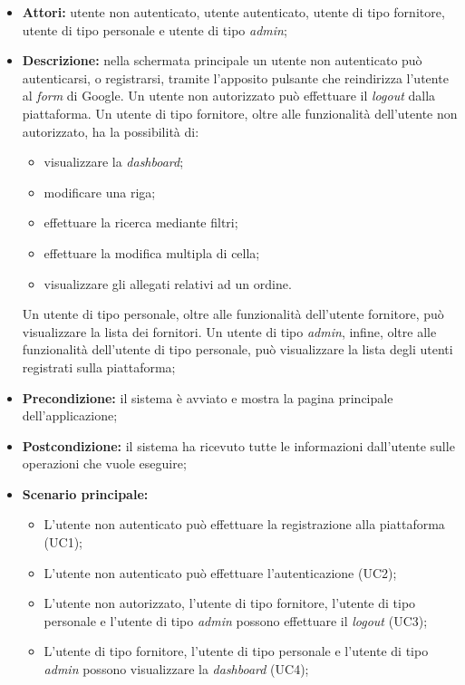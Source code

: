 \begin{itemize}
  \item \textbf{Attori:} utente non autenticato, utente autenticato, utente di tipo fornitore, utente di tipo personale e utente di tipo \emph{admin};
  \item \textbf{Descrizione:} nella schermata principale un utente non autenticato può autenticarsi, o registrarsi, tramite l'apposito pulsante che reindirizza l'utente al \emph{form} di Google. Un utente non autorizzato può effettuare il \emph{logout} dalla piattaforma. Un utente di tipo fornitore, oltre alle funzionalità dell'utente non autorizzato, ha la possibilità di:\
    \begin{itemize}
      \item visualizzare la \emph{dashboard};
      \item modificare una riga;
      \item effettuare la ricerca mediante filtri;
      \item effettuare la modifica multipla di cella;
      \item visualizzare gli allegati relativi ad un ordine.
    \end{itemize}
    Un utente di tipo personale, oltre alle funzionalità dell'utente fornitore, può visualizzare la lista dei fornitori. Un utente di tipo \emph{admin}, infine, oltre alle funzionalità dell'utente di tipo personale, può visualizzare la lista degli utenti registrati sulla piattaforma;
  \item \textbf{Precondizione:} il sistema è avviato e mostra la pagina principale dell'applicazione;
  \item \textbf{Postcondizione:} il sistema ha ricevuto tutte le informazioni dall'utente sulle operazioni che vuole eseguire;
  \item \textbf{Scenario principale:} 
    \begin{itemize}
      \item L'utente non autenticato può effettuare la registrazione alla piattaforma (UC1);
      \item L'utente non autenticato può effettuare l'autenticazione (UC2);
      \item L'utente non autorizzato, l'utente di tipo fornitore, l'utente di tipo personale e l'utente di tipo \emph{admin} possono effettuare il \emph{logout} (UC3);
      \item L'utente di tipo fornitore, l'utente di tipo personale e l'utente di tipo \emph{admin} possono visualizzare la \emph{dashboard} (UC4);

\end{itemize}
\end{itemize}
